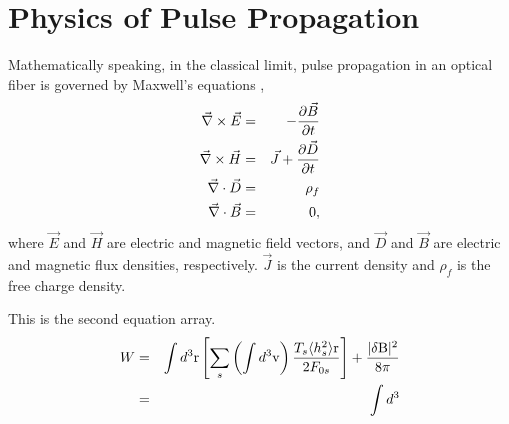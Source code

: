 \section{Physics of Pulse Propagation}

Mathematically speaking, in the classical limit, pulse propagation in an
optical fiber is governed by Maxwell's equations \cite{Agrawal2,Diament}, 
\begin{eqnarray} 
\vec{\nabla}\times\vec{E} & = &- {\partial \vec{B} \over \partial t} \nonumber\\
\vec{\nabla}\times\vec{H} & = & \vec{J}+ {\partial \vec{D} \over \partial t}
\nonumber\\ 
\vec{\nabla}\cdot\vec{D} & = & \rho_{f} \nonumber\\
\vec{\nabla}\cdot\vec{B} & = & 0 ,
\end{eqnarray}
where $\vec{E}$ and $\vec{H}$ are electric and magnetic field
vectors, and
$\vec{D}$ and $\vec{B}$ are electric and magnetic flux densities, 
respectively. $\vec{J}$ is the current density and $\rho_{f}$ is the free
charge density.

This is the second equation array.
\begin{eqnarray}
W & = & \int d^3{\rm r} \left[ \sum_s \left( \int d^3{\rm v} \right){T_{s} \langle h^2_s \rangle {\rm r} \over 2F_{0s}} \right] + {|\delta \rm B|^2 \over 8\pi} \nonumber \\ 
& = & \int d^3 
\end{eqnarray}

